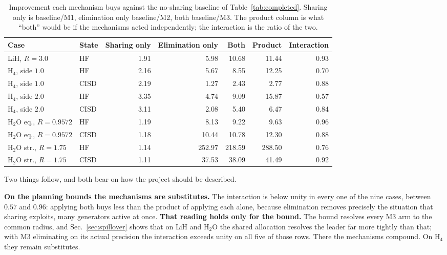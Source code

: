 \documentclass[10pt]{article}
\begin{document}
\begin{table}[!htbp]
\centering
\scriptsize
\caption{Improvement each mechanism buys against the no-sharing baseline of Table~\ref{tab:completed}. Sharing only is baseline/M1, elimination only baseline/M2, both baseline/M3. The product column is what ``both'' would be if the mechanisms acted independently; the interaction is the ratio of the two.}
\label{tab:attribution}
\begin{tabular}{llrrrrr}
\toprule
Case & State & Sharing only & Elimination only & Both & Product & Interaction \\
\midrule
LiH, $R{=}3.0$ & HF & 1.91 & 5.98 & 10.68 & 11.44 & 0.93 \\
H$_4$, side $1.0$ & HF & 2.16 & 5.67 & 8.55 & 12.25 & 0.70 \\
H$_4$, side $1.0$ & CISD & 2.19 & 1.27 & 2.43 & 2.77 & 0.88 \\
H$_4$, side $2.0$ & HF & 3.35 & 4.74 & 9.09 & 15.87 & 0.57 \\
H$_4$, side $2.0$ & CISD & 3.11 & 2.08 & 5.40 & 6.47 & 0.84 \\
H$_2$O eq., $R{=}0.9572$ & HF & 1.19 & 8.13 & 9.22 & 9.63 & 0.96 \\
H$_2$O eq., $R{=}0.9572$ & CISD & 1.18 & 10.44 & 10.78 & 12.30 & 0.88 \\
H$_2$O str., $R{=}1.75$ & HF & 1.14 & 252.97 & 218.59 & 288.50 & 0.76 \\
H$_2$O str., $R{=}1.75$ & CISD & 1.11 & 37.53 & 38.09 & 41.49 & 0.92 \\
\bottomrule
\end{tabular}
\end{table}

Two things follow, and both bear on how the project should be described.

\textbf{On the planning bounds the mechanisms are substitutes.} The interaction is
below unity in every one of the nine cases, between $0.57$ and $0.96$: applying
both buys less than the product of applying each alone, because elimination
removes precisely the situation that sharing exploits, many generators active at
once. \textbf{That reading holds only for the bound.} The bound resolves every M3
arm to the common radius, and Sec.~\ref{sec:spillover} shows that on LiH and
H$_2$O the shared allocation resolves the leader far more tightly than that; with
M3 eliminating on its actual precision the interaction exceeds unity on all five
of those rows. There the mechanisms compound. On H$_4$ they remain substitutes.
\end{document}

